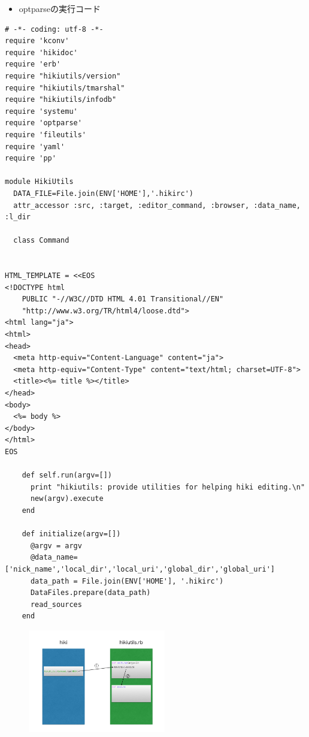 \begin{itemize}
\item optparseの実行コード
\end{itemize}\begin{lstlisting}[style=customRuby]
# -*- coding: utf-8 -*-                                                         
require 'kconv'
require 'hikidoc'
require 'erb'
require "hikiutils/version"
require "hikiutils/tmarshal"
require "hikiutils/infodb"
require 'systemu'
require 'optparse'
require 'fileutils'
require 'yaml'
require 'pp'

module HikiUtils
  DATA_FILE=File.join(ENV['HOME'],'.hikirc')
  attr_accessor :src, :target, :editor_command, :browser, :data_name, :l_dir

  class Command


HTML_TEMPLATE = <<EOS
<!DOCTYPE html                                                                  
    PUBLIC "-//W3C//DTD HTML 4.01 Transitional//EN"                         
    "http://www.w3.org/TR/html4/loose.dtd">                                 
<html lang="ja">                                                            
<html>                                                                      
<head>                                                                      
  <meta http-equiv="Content-Language" content="ja">                         
  <meta http-equiv="Content-Type" content="text/html; charset=UTF-8">       
  <title><%= title %></title>                                               
</head>                                                                     
<body>                                                                      
  <%= body %>                                                               
</body>                                                                     
</html>                                                                     
EOS

    def self.run(argv=[])
      print "hikiutils: provide utilities for helping hiki editing.\n"
      new(argv).execute
    end

    def initialize(argv=[])
      @argv = argv
      @data_name=['nick_name','local_dir','local_uri','global_dir','global_uri']
      data_path = File.join(ENV['HOME'], '.hikirc')
      DataFiles.prepare(data_path)
      read_sources
    end

\end{lstlisting}
\begin{figure}[htbp]\begin{center}
\includegraphics[width=6cm,bb=0 0 442 500]{../figs/./hikiutils_yamane.001.jpg}
\caption{}
\label{default}\end{center}\end{figure}

